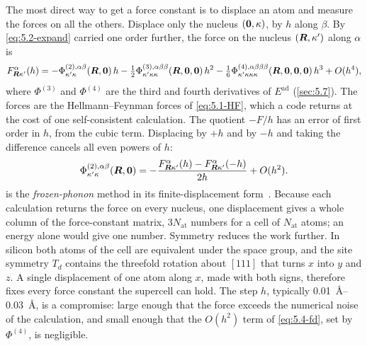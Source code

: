 The most direct way to get a force constant is to displace an atom and measure the forces on all the others. Displace only the nucleus $(\bm{0},\kappa)$, by $h$ along $\beta$. By \cref{eq:5.2-expand} carried one order further, the force on the nucleus $(\bm{R},\kappa')$ along $\alpha$ is
\begin{equation*}
  F^\alpha_{\bm{R}\kappa'}(h) = -\Phi^{(2),\alpha\beta}_{\kappa'\kappa}(\bm{R},\bm{0})\,h - \tfrac12\Phi^{(3),\alpha\beta\beta}_{\kappa'\kappa\kappa}(\bm{R},\bm{0},\bm{0})\,h^2 - \tfrac16\Phi^{(4),\alpha\beta\beta\beta}_{\kappa'\kappa\kappa\kappa}(\bm{R},\bm{0},\bm{0},\bm{0})\,h^3 + O(h^4) ,
\end{equation*}
where $\Phi^{(3)}$ and $\Phi^{(4)}$ are the third and fourth derivatives of $E^{\mathrm{ad}}$ (\cref{sec:5.7}). The forces are the Hellmann--Feynman forces of \cref{eq:5.1-HF}, which a code returns at the cost of one self-consistent calculation. The quotient $-F/h$ has an error of first order in $h$, from the cubic term. Displacing by $+h$ and by $-h$ and taking the difference cancels all even powers of $h$:
\begin{equation}
  \Phi^{(2),\alpha\beta}_{\kappa'\kappa}(\bm{R},\bm{0}) = -\frac{F^\alpha_{\bm{R}\kappa'}(h) - F^\alpha_{\bm{R}\kappa'}(-h)}{2h} + O(h^2) .
  \label{eq:5.4-fd}
\end{equation}
 is the \emph{frozen-phonon} method in its finite-displacement form~\cite[Sect.~IV.B]{baroni2001phonons}. Because each calculation returns the force on every nucleus, one displacement gives a whole column of the force-constant matrix, $3N_{\mathrm{at}}$ numbers for a cell of $N_{\mathrm{at}}$ atoms; an energy alone would give one number. Symmetry reduces the work further. In silicon both atoms of the cell are equivalent under the space group, and the site symmetry $T_d$ contains the threefold rotation about $[111]$ that turns $x$ into $y$ and $z$. A single displacement of one atom along $x$, made with both signs, therefore fixes every force constant the supercell can hold. The step $h$, typically \SIrange{0.01}{0.03}{\angstrom}, is a compromise: large enough that the force exceeds the numerical noise of the calculation, and small enough that the $O(h^2)$ term of \cref{eq:5.4-fd}, set by $\Phi^{(4)}$, is negligible.

